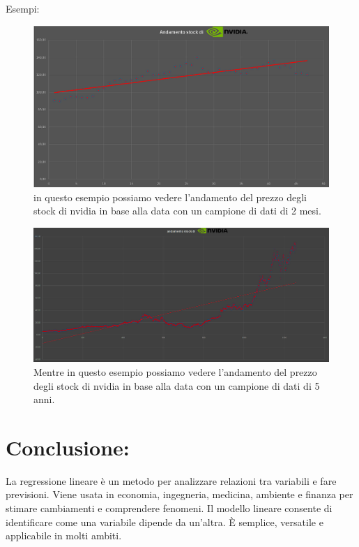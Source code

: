 \documentclass[11pt]{article}
\begin{document}
\begin{center}
    Esempi:\\

\begin{figure}[ht!]
    \centering
    \includegraphics[width=\textwidth]{immagini/Screenshot 2024-11-20 000800.png}
    \caption{in questo esempio possiamo vedere l'andamento del prezzo degli stock di nvidia in base alla data con un campione di dati di 2 mesi.}
\end{figure}
\begin{figure}[ht!]
    \centering
    \includegraphics[width=\textwidth]{immagini/Screenshot 2024-11-20 210756.png}
    \caption{Mentre in questo esempio possiamo vedere l'andamento del prezzo degli stock di nvidia in base alla data con un campione di dati di 5 anni.}
\end{figure}
\end{center}
\section*{Conclusione:}
La regressione lineare è un metodo per analizzare relazioni tra variabili e fare previsioni. Viene usata in economia, ingegneria, medicina, ambiente e finanza 
per stimare cambiamenti e comprendere fenomeni. Il modello lineare consente di identificare come una variabile dipende da un'altra. È semplice, versatile e applicabile 
in molti ambiti.
\end{document}
